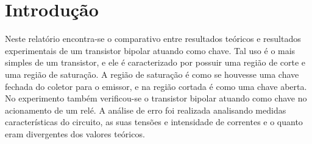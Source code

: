 \chapter*[Introdu\c{c}\~{a}o]{Introdu\c{c}\~{a}o}
Neste relatório encontra-se o comparativo entre resultados teóricos e resultados experimentais de um transistor bipolar atuando como chave.
Tal uso é o mais simples de um transistor, e ele é caracterizado por possuir uma região de corte e uma região de saturação. A região de saturação é como se houvesse uma chave fechada do coletor para o emissor, e na região cortada é como uma chave aberta.
No experimento também verificou-se o transistor bipolar atuando como chave no acionamento de um relé.
A análise de erro foi realizada analisando medidas características do circuito, as suas tensões e intensidade de correntes e o quanto eram divergentes dos valores teóricos. 